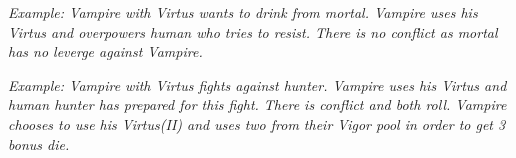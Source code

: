 \textit{Example: 
Vampire with Virtus wants to drink from mortal. 
Vampire uses his Virtus and overpowers human who tries to resist.
There is no conflict as mortal has no leverge against Vampire.}

\textit{
Example: 
Vampire with Virtus fights against hunter.
Vampire uses his Virtus and human hunter has prepared for this fight.
There is conflict and both roll. Vampire chooses to use his Virtus(II) and uses two from their Vigor pool in order to get 3 bonus die.}

\cols{
\SecretVampiricBase{}
\VampiricAbility{}
\VampiricSecret{}
\VampiricKey{}
}
